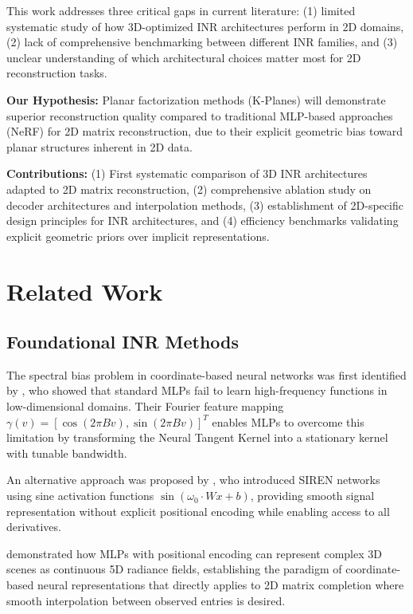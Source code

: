 \documentclass{article}
\begin{document}
This work addresses three critical gaps in current literature: (1) limited systematic study of how 3D-optimized INR architectures perform in 2D domains, (2) lack of comprehensive benchmarking between different INR families, and (3) unclear understanding of which architectural choices matter most for 2D reconstruction tasks.

\textbf{Our Hypothesis:} Planar factorization methods (K-Planes) will demonstrate superior reconstruction quality compared to traditional MLP-based approaches (NeRF) for 2D matrix reconstruction, due to their explicit geometric bias toward planar structures inherent in 2D data.

\textbf{Contributions:} (1) First systematic comparison of 3D INR architectures adapted to 2D matrix reconstruction, (2) comprehensive ablation study on decoder architectures and interpolation methods, (3) establishment of 2D-specific design principles for INR architectures, and (4) efficiency benchmarks validating explicit geometric priors over implicit representations.

\section{Related Work}

\subsection{Foundational INR Methods}

The spectral bias problem in coordinate-based neural networks was first identified by \citet{tancik2020fourier}, who showed that standard MLPs fail to learn high-frequency functions in low-dimensional domains. Their Fourier feature mapping $\gamma(v) = [\cos(2\pi Bv), \sin(2\pi Bv)]^T$ enables MLPs to overcome this limitation by transforming the Neural Tangent Kernel into a stationary kernel with tunable bandwidth.

An alternative approach was proposed by \citet{sitzmann2020siren}, who introduced SIREN networks using sine activation functions $\sin(\omega_0 \cdot Wx + b)$, providing smooth signal representation without explicit positional encoding while enabling access to all derivatives.

\citet{mildenhall2020nerf} demonstrated how MLPs with positional encoding can represent complex 3D scenes as continuous 5D radiance fields, establishing the paradigm of coordinate-based neural representations that directly applies to 2D matrix completion where smooth interpolation between observed entries is desired.
\end{document}
